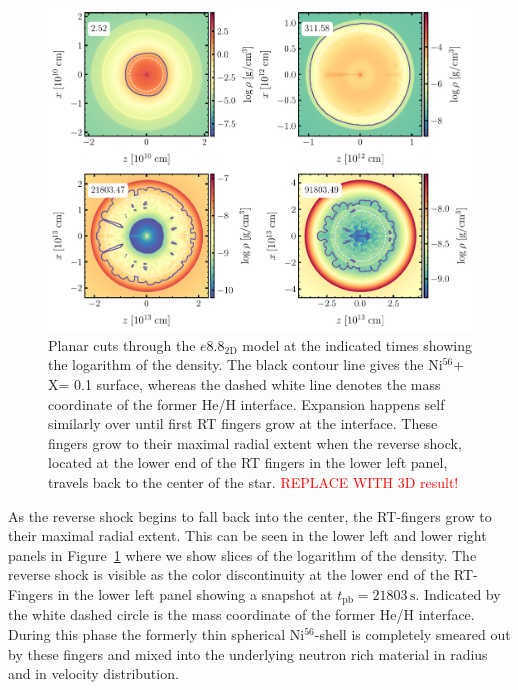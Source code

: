 \documentclass[fleqn,usenatbib]{mnras}
\newcommand{\nickel}{$\mathrm{Ni^{56}}$\xspace}
\newcommand{\tracer}{$\mathrm{X}$\xspace}
\begin{document}
\begin{figure}
 \centering
 \includegraphics[width=\textwidth]{pic/rho_cuts_e10_2d_4times.pdf} 
 \caption{Planar cuts through the $e8.8_{\mathrm{2D}}$ model at the indicated times showing the logarithm of the density. The black contour line gives the \nickel+\tracer = 0.1 surface, whereas the dashed white line denotes the mass coordinate of the former He/H interface. Expansion happens self similarly over until first RT fingers grow at the interface. These fingers grow to their maximal radial extent when the reverse shock, located at the lower end of the RT fingers in the lower left panel, travels back to the center of the star. \textcolor{red}{REPLACE WITH 3D result!}}
 \label{fig:e8 3d 4times}
\end{figure}

As the reverse shock begins to fall back into the center, the RT-fingers grow to their maximal radial extent. This can be seen in the lower left and lower right panels in Figure~\ref{fig:e8 3d 4times} where we show slices of the logarithm of the density. The reverse shock is visible as the color discontinuity at the lower end of the RT-Fingers in the lower left panel showing a snapshot at $t_{\mathrm{pb}}=21803\,\text{s}$. Indicated by the white dashed circle is the mass coordinate of the former He/H interface.
During this phase the formerly thin spherical \nickel-shell is completely smeared out by these fingers and mixed into the underlying neutron rich material in radius and in velocity distribution. 
\end{document}
